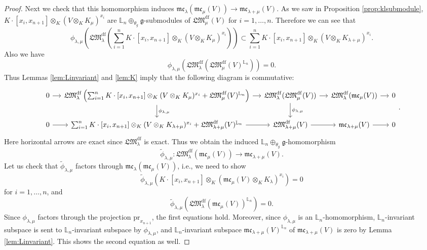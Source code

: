 \documentclass[a4paper,12pt]{article}
\theoremstyle{definition}
\theoremstyle{remark}
\begin{document}
\begin{proof}
Next we check that this homomorphism induces $\mathfrak{mc}_{\lambda}(\mathfrak{mc}_{\mu}(V))
\rightarrow \mathfrak{mc}_{\lambda+\mu}(V)$.
As we saw in Proposition \ref{prop:klsubmodule},
$K\cdot [x_{i},x_{n+1}]\otimes_{K} (V\otimes_{K} K_{\mu})^{x_{i}}$
are $\mathbb{L}_{n}\oplus_{\theta_{g}}\mathfrak{g}$-submodules of $\mathfrak{LM}_{\mu}^{\mathrm{df}}(V)$
for $i=1,\ldots,n$.
Therefore we can see that 
\[
	\phi_{\lambda,\mu}\left(
	\mathfrak{LM}_{\lambda}^{\mathrm{df}}\left(
		\sum_{i=1}^{n} K\cdot [x_{i},x_{n+1}]\otimes_{K} (V\otimes_{K} K_{\mu})^{x_{i}}
		\right)
	\right)
	\subset \sum_{i=1}^{n} K\cdot [x_{i},x_{n+1}]\otimes_{K} (V\otimes_{K} K_{\lambda+\mu})^{x_{i}}.
\]
Also we have
\[
	\phi_{\lambda,\mu}\left(
	\mathfrak{LM}_{\lambda}^{\mathrm{df}}\left(
		\mathfrak{LM}_{\mu}^{\mathrm{df}}(V)^{\mathbb{L}_{n}}
		\right)
	\right)
	=0.
\] 
Thus Lemmas \ref{lem:Linvariant} and \ref{lem:K} imply that
the following diagram is commutative:
\scriptsize
\[
\begin{tikzcd}[column sep=small]
	0 \arrow[r] & \mathfrak{LM}_{\lambda}^{\mathrm{df}}\left(
		\sum_{i=1}^{n} K\cdot [x_{i},x_{n+1}]\otimes_{K} (V\otimes_{K} K_{\mu})^{x_{i}}
		+\mathfrak{LM}_{\mu}^{\mathrm{df}}(V)^{\mathbb{L}_{n}}
		\right) \arrow[r] \arrow[d,"\phi_{\lambda,\mu}"] & \mathfrak{LM}_{\lambda}^{\mathrm{df}}(\mathfrak{LM}_{\mu}^{\mathrm{df}}(V)) \arrow[r] \arrow[d, "\phi_{\lambda,\mu}"] 
		& \mathfrak{LM}^{\mathrm{df}}_{\lambda}(\mathfrak{mc}_{\mu}(V)) \arrow[r]  & 0\\
	0 \arrow[r] & \sum_{i=1}^{n} K\cdot [x_{i},x_{n+1}]\otimes_{K} (V\otimes_{K} K_{\lambda+\mu})^{x_{i}}
	+\mathfrak{LM}_{\lambda+\mu}^{\mathrm{df}}(V)^{\mathbb{L}_{n}} \arrow[r] & \mathfrak{LM}_{\lambda+\mu}^{\mathrm{df}}(V) \arrow[r] & \mathfrak{mc}_{\lambda+\mu}(V) \arrow[r] & 0	
\end{tikzcd}.
\]
\normalsize
Here horizontal arrows are exact since $\mathfrak{LM}_{\lambda}^{\mathrm{df}}$ is exact.
Thus we obtain the induced $\mathbb{L}_{n}\oplus_{\theta_{g}}\mathfrak{g}$-homomorphism
\[
	\widetilde{\phi}_{\lambda,\mu}\colon 
	\mathfrak{LM}_{\lambda}^{\mathrm{df}}(
	\mathfrak{mc}_{\mu}(V))
	\rightarrow 
	\mathfrak{mc}_{\lambda+\mu}(V).
\]
Let us check that $\widetilde{\phi}_{\lambda,\mu}$  factors through $\mathfrak{mc}_{\lambda}(\mathfrak{mc}_{\mu}(V))$,
i.e., we need to show  
\[
	\widetilde{\phi}_{\lambda,\mu}\left(
K\cdot [x_{i},x_{n+1}]\otimes_{K} (\mathfrak{mc}_{\mu}(V)\otimes_{K} K_{\lambda})^{x_{i}}
	\right)=0
\]
for $i=1,\ldots,n$, and
\[
	\widetilde{\phi}_{\lambda,\mu}\left(
		\mathfrak{LM}_{\lambda}^{\mathrm{df}}\left(\mathfrak{mc}_{\mu}(V)\right)^{\mathbb{L}_{n}}
	\right)=0.
\] 
Since $\phi_{\lambda,\mu}$ factors through the projection $\mathrm{pr}_{x_{n+1}}$, 
the first equations hold.
Moreover, since $\phi_{\lambda,\mu}$ is an $\mathbb{L}_{n}$-homomorphism,
$\mathbb{L}_{n}$-invariant subspace 
is sent to $\mathbb{L}_{n}$-invariant subspace by $\phi_{\lambda,\mu}$,
and $\mathbb{L}_{n}$-invariant subspace 
$\mathfrak{mc}_{\lambda+\mu}(V)^{\mathbb{L}_{n}}$ of $\mathfrak{mc}_{\lambda+\mu}(V)$ is zero by Lemma \ref{lem:Linvariant}. 
This shows the second equation as well.


\end{proof}
\end{document}
